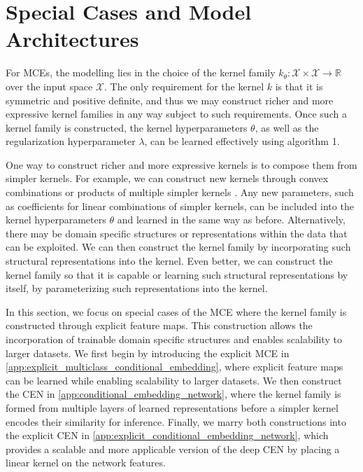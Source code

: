\documentclass[runningheads, envcountsame, a4paper]{llncs}
\begin{document}
	\newpage
	\section{Special Cases and Model Architectures}
	\label{app:special_cases}
	
		For \glspl{MCE}, the modelling lies in the choice of the kernel family $k_{\theta} : \mathcal{X} \times \mathcal{X} \to \mathbb{R}$ over the input space $\mathcal{X}$. The only requirement for the kernel $k$ is that it is symmetric and positive definite, and thus we may construct richer and more expressive kernel families in any way subject to such requirements. Once such a kernel family is constructed, the kernel hyperparameters $\theta$, as well as the regularization hyperparameter $\lambda$, can be learned effectively using algorithm 1.
		
		One way to construct richer and more expressive kernels is to compose them from simpler kernels. For example, we can construct new kernels through convex combinations or products of multiple simpler kernels \citep{genton2001classes}. Any new parameters, such as coefficients for linear combinations of simpler kernels, can be included into the kernel hyperparameters $\theta$ and learned in the same way as before. Alternatively, there may be domain specific structures or representations within the data that can be exploited. We can then construct the kernel family by incorporating such structural representations into the kernel. Even better, we can construct the kernel family so that it is capable or learning such structural representations by itself, by parameterizing such representations into the kernel.
		
		In this section, we focus on special cases of the \gls{MCE} where the kernel family is constructed through explicit feature maps. This construction allows the incorporation of trainable domain specific structures and enables scalability to larger datasets. We first begin by introducing the explicit \gls{MCE} in \cref{app:explicit_multiclass_conditional_embedding}, where explicit feature maps can be learned while enabling scalability to larger datasets. We then construct the \gls{CEN} in \cref{app:conditional_embedding_network}, where the kernel family is formed from multiple layers of learned representations before a simpler kernel encodes their similarity for inference. Finally, we marry both constructions into the explicit \gls{CEN} in \cref{app:explicit_conditional_embedding_network}, which provides a scalable and more applicable version of the deep \gls{CEN} by placing a linear kernel on the network features.
		
\end{document}
